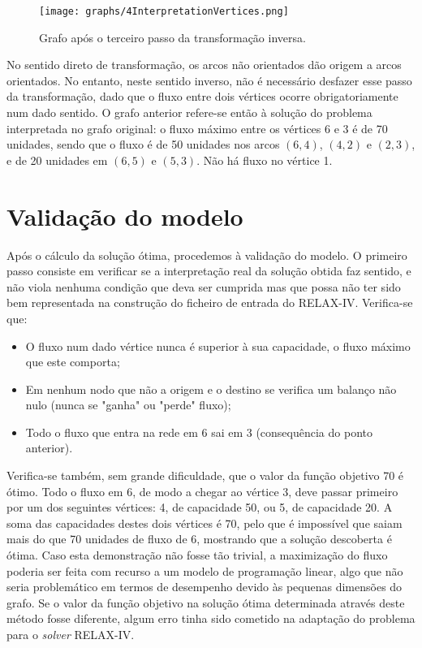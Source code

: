 \documentclass[12pt, a4paper, titlepage]{article}
\begin{document}
\begin{figure}[H]
    \centering
    \texttt{[image: graphs/4InterpretationVertices.png]}
    \caption{Grafo após o terceiro passo da transformação inversa.}
    \label{4interpretation-graph}
\end{figure}

No sentido direto de transformação, os arcos não orientados dão origem a arcos orientados. No
entanto, neste sentido inverso, não é necessário desfazer esse passo da transformação, dado que o
fluxo entre dois vértices ocorre obrigatoriamente num dado sentido. O grafo anterior refere-se então
à solução do problema interpretada no grafo original: o fluxo máximo entre os vértices 6 e 3 é de 70
unidades, sendo que o fluxo é de 50 unidades nos arcos $(6, 4)$, $(4, 2)$ e $(2, 3)$, e de 20
unidades em $(6, 5)$ e $(5, 3)$. Não há fluxo no vértice 1.

\section{Validação do modelo}

Após o cálculo da solução ótima, procedemos à validação do modelo. O primeiro passo consiste em
verificar se a interpretação real da solução obtida faz sentido, e não viola nenhuma condição que
deva ser cumprida mas que possa não ter sido bem representada na construção do ficheiro de entrada
do RELAX-IV. Verifica-se que:

\begin{itemize}
    \item O fluxo num dado vértice nunca é superior à sua capacidade, o fluxo máximo que este
        comporta;
    \item Em nenhum nodo que não a origem e o destino se verifica um balanço não nulo (nunca se
        "ganha"{} ou "perde"{} fluxo);
    \item Todo o fluxo que entra na rede em 6 sai em 3 (consequência do ponto anterior).
\end{itemize}


Verifica-se também, sem grande dificuldade, que o valor da função objetivo 70 é ótimo. Todo o fluxo
em 6, de modo a chegar ao vértice 3, deve passar primeiro por um dos seguintes vértices: 4, de
capacidade 50, ou 5, de capacidade 20. A soma das capacidades destes dois vértices é 70, pelo que é
impossível que saiam mais do que 70 unidades de fluxo de 6, mostrando que a solução descoberta é
ótima. Caso esta demonstração não fosse tão trivial, a maximização do fluxo poderia ser feita com
recurso a um modelo de programação linear, algo que não seria problemático em termos de desempenho
devido às pequenas dimensões do grafo. Se o valor da função objetivo na solução ótima determinada
através deste método fosse diferente, algum erro tinha sido cometido na adaptação do problema para o
\emph{solver} RELAX-IV.
\end{document}
